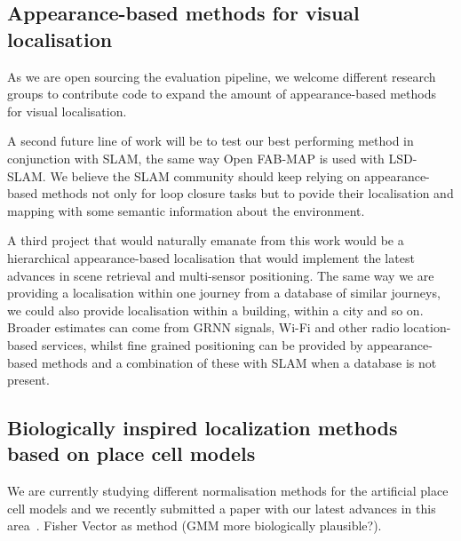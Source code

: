 \subsection{Appearance-based methods for visual localisation}
As we are open sourcing the evaluation pipeline, we welcome different research groups to contribute code to expand the amount of appearance-based methods for visual localisation.

A second future line of work will be to test our best performing method in conjunction with SLAM, the same way Open FAB-MAP is used with LSD-SLAM. We believe the SLAM community should keep relying on appearance-based methods not only for loop closure tasks but to povide their localisation and mapping with some semantic information about the environment.

A third project that would naturally emanate from this work would be a hierarchical appearance-based localisation that would implement the latest advances in scene retrieval and multi-sensor positioning. The same way we are providing a localisation within one journey from a database of similar journeys, we could also provide localisation within a building, within a city and so on. Broader estimates can come from GRNN signals, Wi-Fi and other radio location-based services, whilst fine grained positioning can be provided by appearance-based methods and a combination of these with SLAM when a database is not present.

\subsection{Biologically inspired localization methods based on place cell models}

We are currently studying different normalisation methods for the artificial place cell models and we recently submitted a paper with our latest advances in this area~\cite{Rivera-Rubio2015tnnls}. 
Fisher Vector as method (GMM more biologically plausible?). 

